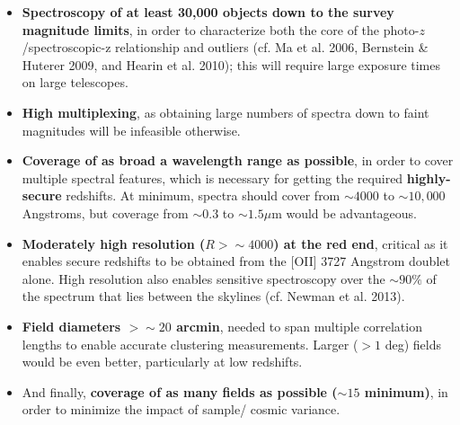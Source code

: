 \begin{itemize}
\item {\bf Spectroscopy of at least 30,000 objects down to the survey magnitude limits}, in order to characterize both the core of the photo-$z$/spectroscopic-z relationship and outliers (cf. Ma et al. 2006, Bernstein \& Huterer 2009, and Hearin et al. 2010); this will require large exposure times on large telescopes.
\item {\bf High multiplexing}, as obtaining large numbers of spectra down to faint magnitudes will be infeasible otherwise.
\item {\bf Coverage of as broad a wavelength range as possible}, in order to cover multiple spectral features, which is necessary for getting the required {\bf highly-secure} redshifts.  At minimum, spectra should cover from $\sim 4000$ to $\sim 10,000$ Angstroms, but coverage from $\sim 0.3$ to $\sim 1.5\mu$m would be advantageous.
\item {\bf Moderately high resolution ($R>\sim 4000$) at the red end}, critical as it enables secure redshifts to be obtained from the [OII] 3727 Angstrom doublet alone.  High resolution also enables sensitive spectroscopy over the $\sim 90\%$ of the spectrum that lies between the skylines (cf. Newman et al. 2013).
\item {\bf Field diameters $>\sim20$ arcmin}, needed to span multiple correlation lengths to enable accurate clustering measurements.
Larger ($>1$ deg) fields would be even better, particularly at low redshifts.
\item And finally, {\bf coverage of as many fields as possible ($\sim 15$ minimum)}, in order to minimize the impact of sample/ cosmic variance.
\end{itemize}


